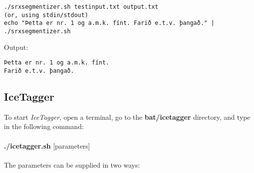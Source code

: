 \documentclass[11pt]{article}
\begin{document}
\begin{verbatim}
./srxsegmentizer.sh testinput.txt output.txt 
(or, using stdin/stdout)
echo "Þetta er nr. 1 og a.m.k. fínt. Farið e.t.v. þangað." | ./srxsegmentizer.sh
\end{verbatim}

Output:
\begin{verbatim}
Þetta er nr. 1 og a.m.k. fínt. 
Farið e.t.v. þangað. 
\end{verbatim}

\subsection{IceTagger}
\label{sec:icetagger_usage}
To start \emph{IceTagger}, open a terminal, go to the \textbf{bat/icetagger} directory, and type in the following command:\\ \\
{\bf ./icetagger.sh} [parameters] \\ \\
The parameters can be supplied in two ways:
\end{document}
